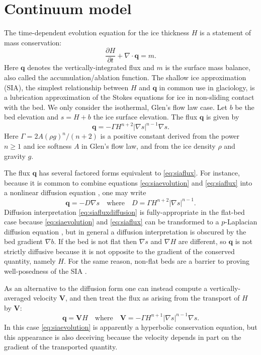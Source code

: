 \documentclass[twocolumn,letterpaper]{igs}
\newcommand\bq{\mathbf{q}}
\newcommand\bV{\mathbf{V}}
\newcommand{\Div}{\nabla\cdot}
\newcommand{\grad}{\nabla}
\begin{document}
\section{Continuum model}

The time-dependent evolution equation for the ice thickness $H$ is a statement of mass conservation:
\begin{equation}
\frac{\partial H}{\partial t} + \Div \bq = m.  \label{eq:siaevolution}
\end{equation}
Here $\bq$ denotes the vertically-integrated flux and $m$ is the surface mass balance, also called the accumulation/ablation function.  The shallow ice approximation (SIA), the simplest relationship between $H$ and $\bq$ in common use in glaciology, is a lubrication approximation \citep{Fowler1997} of the Stokes equations for ice in non-sliding contact with the bed.  We only consider the isothermal, Glen's flow law \citep{GreveBlatter2009} case.  Let $b$ be the bed elevation and $s = H+b$ the ice surface elevation.  The flux $\bq$ is given by
\begin{equation}
\bq = - \Gamma H^{n+2} |\grad s|^{n-1} \grad s.  \label{eq:siaflux}
\end{equation}
Here $\Gamma = 2 A (\rho g)^n / (n+2)$ is a positive constant derived from the power $n\ge 1$ and ice softness $A$ in Glen's flow law, and from the ice density $\rho$ and gravity $g$.

The flux $\bq$ has several factored forms equivalent to \eqref{eq:siaflux}.  For instance, because it is common to combine equations \eqref{eq:siaevolution} and \eqref{eq:siaflux} into a nonlinear diffusion equation \citep{Huybrechtsetal1996}, one may write
\begin{equation}
\bq = - D \grad s \quad \text{where} \quad D =  \Gamma H^{n+2} |\grad s|^{n-1}. \label{eq:siafluxdiffusion}
\end{equation}
Diffusion interpretation \eqref{eq:siafluxdiffusion} is fully-appropriate in the flat-bed case because \eqref{eq:siaevolution} and \eqref{eq:siaflux} can be transformed to a $p$-Laplacian diffusion equation \citep{Calvoetal2002}, but in general a diffusion interpretation is obscured by the bed gradient $\grad b$.  If the bed is not flat then $\grad s$ and $\grad H$ are different, so $\bq$ is not strictly diffusive because it is not opposite to the gradient of the conserved quantity, namely $H$.  For the same reason, non-flat beds are a barrier to proving well-posedness of the SIA  \citep{JouvetBueler2012}.

As an alternative to the diffusion form one can instead compute a vertically-averaged velocity $\bV$, and then treat the flux as arising from the transport of $H$ by $\bV$:
\begin{equation}
\bq = \bV H \quad \text{where} \quad \bV = - \Gamma H^{n+1} |\grad s|^{n-1} \grad s. \label{eq:siafluxvelocity}
\end{equation}
In this case \eqref{eq:siaevolution} is apparently a hyperbolic conservation equation, but this appearance is also deceiving because the velocity depends in part on the gradient of the transported quantity. 
\end{document}
